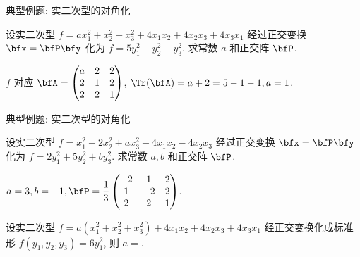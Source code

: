 \begin{frame}{典型例题: 实二次型的对角化}
	\onslide<+->
	\begin{example}
		设实二次型 $f=ax_1^2+x_2^2+x_3^2+4x_1x_2+4x_2x_3+4x_3x_1$ 经过正交变换 $\bfx=\bfP\bfy$ 化为 $f=5y_1^2-y_2^2-y_3^2$.
		求常数 $a$ 和正交阵 $\bfP$.
	\end{example}
	\onslide<+->
	\begin{solution}
		$f$ 对应 $\bfA=\begin{pmatrix}
			a&2&2\\
			2&1&2\\
			2&2&1
		\end{pmatrix}$, $\Tr(\bfA)=a+2=5-1-1,a=1$.

	\end{solution}
\end{frame}


\begin{frame}{典型例题: 实二次型的对角化}
	\onslide<+->
	\begin{exercise}
		设实二次型 $f=x_1^2+2x_2^2+ax_3^2-4x_1x_2-4x_2x_3$ 经过正交变换 $\bfx=\bfP\bfy$ 化为 $f=2y_1^2+5y_2^2+by_3^2$.
		求常数 $a,b$ 和正交阵 $\bfP$.
	\end{exercise}
	\onslide<+->
	\begin{answer}
		$a=3,b=-1,\bfP=\dfrac13\begin{pmatrix}
			-2&1&2\\
			1&-2&2\\
			2&2&1
		\end{pmatrix}$.
	\end{answer}
	\onslide<+->
	\begin{example}
		设实二次型 $f=a(x_1^2+x_2^2+x_3^2)+4x_1x_2+4x_2x_3+4x_3x_1$ 经正交变换化成标准形 $f(y_1,y_2,y_3)=6y_1^2$, 则 $a=$.
	\end{example}
\end{frame}
